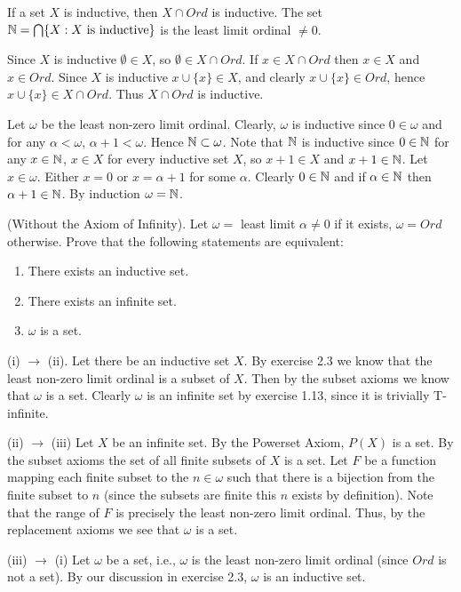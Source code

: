 \begin{problem}
  If a set $X$ is inductive, then $X \cap Ord$ is inductive.
  The set $\mathbb{N} = \bigcap \{X : X \text{ is inductive}\}$ is the least limit ordinal $\neq 0$.
\end{problem}

\begin{solution}
  Since $X$ is inductive $\emptyset \in X$, so $\emptyset \in X \cap Ord$.
  If $x \in X \cap Ord$ then $x \in X$ and $x \in Ord$.
  Since $X$ is inductive $x \cup \{x\} \in X$, and clearly $x \cup \{x\} \in Ord$, hence $x \cup \{x\} \in X \cap Ord$.
  Thus $X \cap Ord$ is inductive.

  Let $\omega$ be the least non-zero limit ordinal.
  Clearly, $\omega$ is inductive since $0 \in \omega$ and for any $\alpha < \omega$, $\alpha + 1 < \omega$.
  Hence $\mathbb{N} \subset \omega$.
  Note that $\mathbb{N}$ is inductive since $0 \in \mathbb{N}$ for any $x \in \mathbb{N}$, $x \in X$ for every inductive set $X$, so $x + 1 \in X$ and $x + 1 \in \mathbb{N}$.
  Let $x \in \omega$.
  Either $x = 0$ or $x = \alpha + 1$ for some $\alpha$.
  Clearly $0 \in \mathbb{N}$ and if $\alpha \in \mathbb{N}$ then $\alpha + 1 \in \mathbb{N}$.
  By induction $\omega = \mathbb{N}$.
\end{solution}

\begin{problem}
  (Without the Axiom of Infinity).
  Let $\omega =$ least limit $\alpha \neq 0$ if it exists, $\omega = Ord$ otherwise.
  Prove that the following statements are equivalent:
  \begin{enumerate}[label=(\roman*)]
    \item There exists an inductive set.
    \item There exists an infinite set.
    \item $\omega$ is a set.
  \end{enumerate}
\end{problem}

\begin{solution}
  (i) $\rightarrow$ (ii).
  Let there be an inductive set $X$.
  By exercise 2.3 we know that the least non-zero limit ordinal is a subset of $X$.
  Then by the subset axioms we know that $\omega$ is a set.
  Clearly $\omega$ is an infinite set by exercise 1.13, since it is trivially T-infinite.

  (ii) $\rightarrow$ (iii)
  Let $X$ be an infinite set.
  By the Powerset Axiom, $P(X)$ is a set.
  By the subset axioms the set of all finite subsets of $X$ is a set.
  Let $F$ be a function mapping each finite subset to the $n \in \omega$ such that there is a bijection from the finite subset to $n$ (since the subsets are finite this $n$ exists by definition).
  Note that the range of $F$ is precisely the least non-zero limit ordinal.
  Thus, by the replacement axioms we see that $\omega$ is a set.

  (iii) $\rightarrow$ (i)
  Let $\omega$ be a set, i.e., $\omega$ is the least non-zero limit ordinal (since $Ord$ is not a set).
  By our discussion in exercise 2.3, $\omega$ is an inductive set.
\end{solution}

